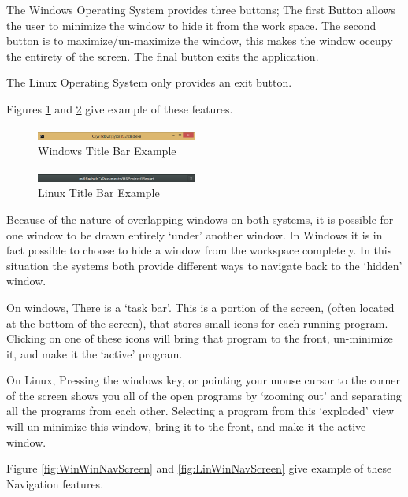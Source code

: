 \documentclass[a4paper]{report}
\begin{document}
The Windows Operating System provides three buttons; The first Button allows the user to minimize the window to hide it from the work space. The second button is to maximize/un-maximize the window, this makes the window occupy the entirety of the screen. The final button exits the application.

The Linux Operating System only provides an exit button.

Figures \ref{fig:WinTitleBarScreen} and \ref{fig:LinTitleBarScreen} give example of these features.

\begin{figure}[ht]
\centering
\includegraphics[width=200px]{images/Windows_title_bar_screenshot}
\caption{Windows Title Bar Example}
\label{fig:WinTitleBarScreen}
\end{figure}

\begin{figure}[ht]
\centering
\includegraphics[width=200px]{images/Linux_title_bar_screenshot}
\caption{Linux Title Bar Example}
\label{fig:LinTitleBarScreen}
\end{figure}

Because of the nature of overlapping windows on both systems, it is possible for one window to be drawn entirely `under' another window. In Windows it is in fact possible to choose to hide a window from the workspace completely. In this situation the systems both provide different ways to navigate back to the `hidden' window.

On windows, There is a `task bar'. This is a portion of the screen, (often located at the bottom of the screen), that stores small icons for each running program. Clicking on one of these icons will bring that program to the front, un-minimize it, and make it the `active' program.

On Linux, Pressing the windows key, or pointing your mouse cursor to the corner of the screen shows you all of the open programs by `zooming out' and separating all the programs from each other. Selecting a program from this `exploded' view will un-minimize this window, bring it to the front, and make it the active window.

Figure \ref{fig:WinWinNavScreen} and \ref{fig:LinWinNavScreen} give example of these Navigation features.
\end{document}
